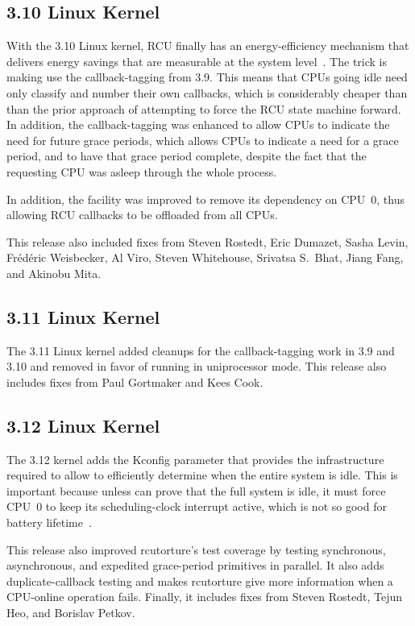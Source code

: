 \subsection{3.10 Linux Kernel}

With the 3.10 Linux kernel, RCU finally has an energy-efficiency mechanism
that delivers energy savings that are measurable at the system
level~\cite{PaulMcKenney2013AMPenergyHOTPAR}.
The trick is making  use the callback-tagging from
3.9.
This means that CPUs going idle need only classify and number their own
callbacks, which is considerably cheaper than than the prior approach
of attempting to force the RCU state machine forward.
In addition, the callback-tagging was enhanced to allow CPUs to indicate
the need for future grace periods, which allows CPUs to indicate a need
for a grace period, and to have that grace period complete, despite the
fact that the requesting CPU was asleep through the whole process.

In addition, the  facility was improved to
remove its dependency on CPU~0, thus allowing RCU callbacks to be offloaded
from all CPUs.

This release also included fixes from Steven Rostedt, Eric Dumazet,
Sasha Levin, Fr\'ed\'eric Weisbecker, Al Viro, Steven Whitehouse,
Srivatsa S.~Bhat, Jiang Fang, and Akinobu Mita.

\subsection{3.11 Linux Kernel}

The 3.11 Linux kernel added cleanups for the callback-tagging work
in 3.9 and 3.10 and removed  in favor of running
 in uniprocessor mode.
This release also includes fixes from Paul Gortmaker and Kees Cook.

\subsection{3.12 Linux Kernel}

The 3.12 kernel adds the  Kconfig
parameter that provides the infrastructure required to allow
 to efficiently determine when the entire
system is idle.
This is important because unless  can prove
that the full system is idle, it must force CPU~0 to keep its
scheduling-clock interrupt active, which is not so good for battery
lifetime~\cite{JonathanCorbet2013SYSIDLE}.

This release also improved rcutorture's test coverage by testing
synchronous, asynchronous, and expedited grace-period primitives
in parallel.
It also adds duplicate-callback testing and makes rcutorture give
more information when a CPU-online operation fails.
Finally, it includes fixes from Steven Rostedt, Tejun Heo, and Borislav
Petkov.
